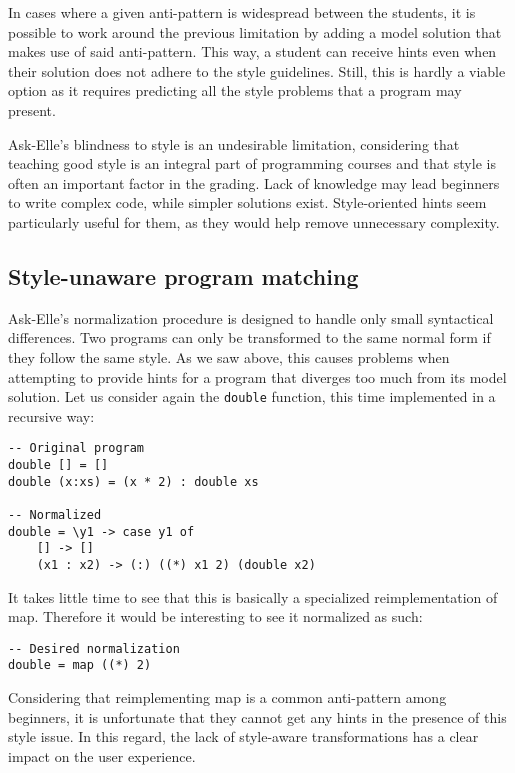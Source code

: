 In cases where a given anti-pattern is widespread between the students, it is possible to work around the previous limitation by adding a model solution that makes use of said anti-pattern. This way, a student can receive hints even when their solution does not adhere to the style guidelines. Still, this is hardly a viable option as it requires predicting all the style problems that a program may present.

Ask-Elle's blindness to style is an undesirable limitation, considering that teaching good style is an integral part of programming courses and that style is often an important factor in the grading. Lack of knowledge may lead beginners to write complex code, while simpler solutions exist. Style-oriented hints seem particularly useful for them, as they would help remove unnecessary complexity.

\subsection{Style-unaware program matching}

Ask-Elle's normalization procedure is designed to handle only small syntactical differences. Two programs can only be transformed to the same normal form if they follow the same style. As we saw above, this causes problems when attempting to provide hints for a program that diverges too much from its model solution. Let us consider again the \texttt{double} function, this time implemented in a recursive way:

\begin{verbatim}
-- Original program
double [] = []
double (x:xs) = (x * 2) : double xs

-- Normalized
double = \y1 -> case y1 of
    [] -> []
    (x1 : x2) -> (:) ((*) x1 2) (double x2)
\end{verbatim}

It takes little time to see that this is basically a specialized reimplementation of map. Therefore it would be interesting to see it normalized as such:

\begin{verbatim}
-- Desired normalization
double = map ((*) 2)
\end{verbatim}

Considering that reimplementing map is a common anti-pattern among beginners, it is unfortunate that they cannot get any hints in the presence of this style issue. In this regard, the lack of style-aware transformations has a clear impact on the user experience.
